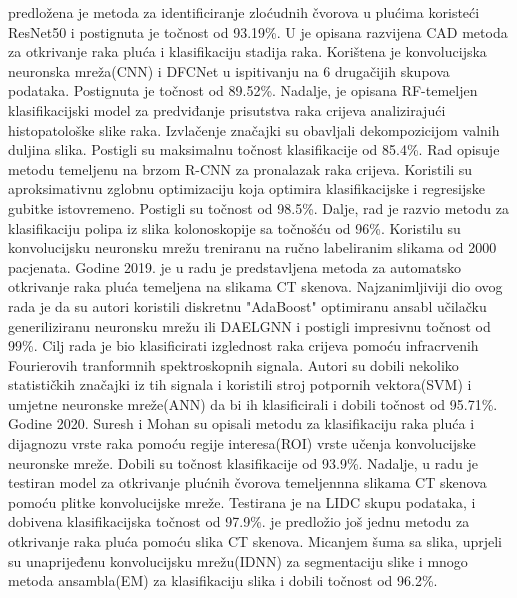 \documentclass[conference, utf8]{IEEEtran}
\begin{document}
predložena je metoda za identificiranje zloćudnih čvorova u plućima koristeći ResNet50 i postignuta je točnost od 93.19\%. U \cite{masood2018computer} je opisana razvijena CAD metoda za otkrivanje raka pluća i klasifikaciju stadija raka. Korištena je konvolucijska neuronska mreža(CNN) i DFCNet u ispitivanju na 6 drugačijih skupova podataka. Postignuta je točnost od 89.52\%. Nadalje, \cite{babu2018colon} je opisana RF-temeljen klasifikacijski model za predviđanje prisutstva raka crijeva analizirajući histopatološke slike raka. Izvlačenje značajki su obavljali dekompozicijom valnih duljina slika. Postigli su maksimalnu točnost klasifikacije od 85.4\%. Rad \cite{mo2018efficient} opisuje metodu temeljenu na brzom R-CNN za pronalazak raka crijeva. Koristili su aproksimativnu zglobnu optimizaciju koja optimira klasifikacijske i regresijske gubitke istovremeno. Postigli su točnost od 98.5\%. Dalje, rad \cite{urban2018deep} je razvio metodu za klasifikaciju polipa iz slika kolonoskopije sa točnošću od 96\%. Koristilu su konvolucijsku neuronsku mrežu treniranu na ručno labeliranim slikama od 2000 pacjenata. Godine 2019. je u radu \cite{shakeel2020automatic} je predstavljena metoda za automatsko otkrivanje raka pluća temeljena na slikama CT skenova. Najzanimljiviji dio ovog rada je da su autori koristili diskretnu "AdaBoost" optimiranu ansabl učilačku generiliziranu neuronsku mrežu ili DAELGNN i postigli impresivnu točnost od 99\%. Cilj rada \cite{toraman2019classification} je bio klasificirati izglednost raka crijeva pomoću infracrvenih Fourierovih tranformnih spektroskopnih signala. Autori su dobili nekoliko statističkih značajki iz tih signala i koristili stroj potpornih vektora(SVM) i umjetne neuronske mreže(ANN) da bi ih klasificirali i dobili točnost od 95.71\%. Godine 2020. Suresh i Mohan \cite{suresh2020roi} su opisali metodu za klasifikaciju raka pluća i dijagnozu vrste raka pomoću regije interesa(ROI) vrste učenja konvolucijske neuronske mreže. Dobili su točnost klasifikacije od 93.9\%. Nadalje, u radu \cite{masud2020light} je testiran model za otkrivanje plućnih čvorova temeljennna slikama CT skenova pomoću plitke konvolucijske mreže. Testirana je na LIDC skupu podataka, i dobivena klasifikacijska točnost od 97.9\%. \cite{shakeel2022automatic} je predložio još jednu metodu za otkrivanje raka pluća pomoću slika CT skenova. Micanjem šuma sa slika, uprjeli su unaprijeđenu konvolucijsku mrežu(IDNN) za segmentaciju slike i mnogo metoda ansambla(EM) za klasifikaciju slika i dobili točnost od 96.2\%.
	
\end{document}
